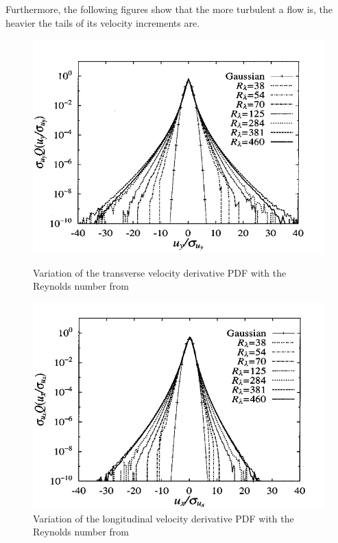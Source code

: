\documentclass[a4paper,12pt]{article}
\theoremstyle{definition}
\begin{document}
Furthermore, the following figures show that the more turbulent a flow is, the heavier the tails of its velocity increments are.
\begin{figure}[H]
    \centering
    \begin{minipage}{0.49\textwidth}
        \centering
        \includegraphics[width=\linewidth]{illustrations/TransVelIncrRe.png}
        \caption{Variation of the transverse velocity derivative PDF with the Reynolds number from \cite{GotohVelIncr}}
    \end{minipage}
    \hfill
    \begin{minipage}{0.49\textwidth}
        \centering
        \includegraphics[width=\linewidth]{illustrations/LongVelIncrRe.png}
        \caption{Variation of the longitudinal velocity derivative PDF with the Reynolds number from \cite{GotohVelIncr}}
    \end{minipage}
\end{figure}
\end{document}
